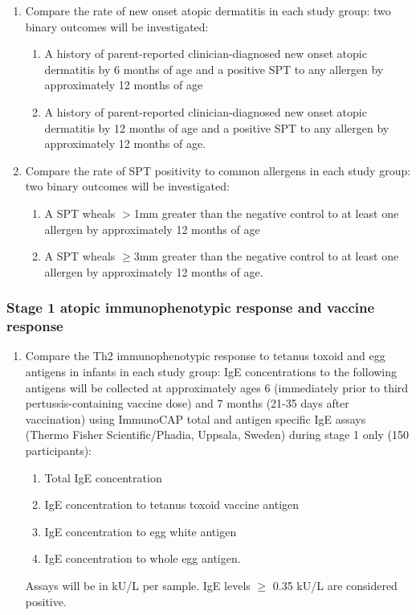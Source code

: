 \documentclass{bmcart}
\begin{document}
\begin{enumerate}
	\item Compare the rate of new onset atopic dermatitis in each study group:
	two binary outcomes will be investigated:
	\begin{enumerate}
		\item A history of parent-reported clinician-diagnosed new onset atopic dermatitis by 6 months of age and a positive SPT to any allergen by approximately 12 months of age
		\item A history of parent-reported clinician-diagnosed new onset atopic dermatitis by 12 months of age and a positive SPT to any allergen by approximately 12 months of age.
	\end{enumerate}
	\item Compare the rate of SPT positivity to common allergens in each study group:
	two binary outcomes will be investigated:
	\begin{enumerate}
		\item A SPT wheals $>$1mm greater than the negative control to at least one allergen by approximately 12 months of age
		\item A SPT wheals $\geq$3mm greater than the negative control to at least one allergen by approximately 12 months of age.
	\end{enumerate}
\end{enumerate}

\subsubsection*{Stage 1 atopic immunophenotypic response and vaccine response}

\begin{enumerate}[resume]
	\item Compare the Th2 immunophenotypic response to tetanus toxoid and egg antigens in infants in each study group:
	IgE concentrations to the following antigens will be collected at approximately ages 6 (immediately prior to third pertussis-containing vaccine dose) and 7 months (21-35 days after vaccination) using ImmunoCAP total and antigen specific IgE assays (Thermo Fisher Scientific/Phadia, Uppsala, Sweden) during stage 1 only (150 participants):
	\begin{enumerate}
		\item Total IgE concentration
		\item IgE concentration to tetanus toxoid vaccine antigen
		\item IgE concentration to egg white antigen
		\item IgE concentration to whole egg antigen.
	\end{enumerate}
	Assays will be in kU/L per sample.
	IgE levels $\geq$ 0.35 kU/L are considered positive.
\end{enumerate}
\end{document}
